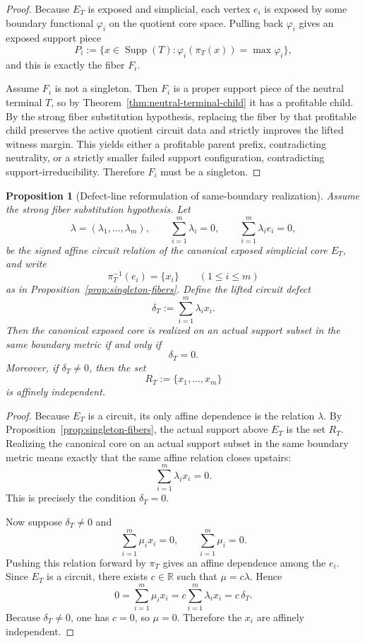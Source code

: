 \documentclass[11pt]{article}
\newtheorem{proposition}[theorem]{Proposition}
\theoremstyle{definition}
\newcommand{\R}{\mathbb{R}}
\newcommand{\1}{\mathbf{1}}
\begin{document}
\begin{proof}
Because $E_T$ is exposed and simplicial, each vertex $e_i$ is exposed by some boundary functional $\varphi_i$ on the quotient core space. Pulling back $\varphi_i$ gives an exposed support piece
\[
P_i:=\{x\in \operatorname{Supp}(T):\varphi_i(\pi_T(x))=\max \varphi_i\},
\]
and this is exactly the fiber $F_i$.

Assume $F_i$ is not a singleton. Then $F_i$ is a proper support piece of the neutral terminal $T$, so by Theorem~\ref{thm:neutral-terminal-child} it has a profitable child. By the strong fiber substitution hypothesis, replacing the fiber by that profitable child preserves the active quotient circuit data and strictly improves the lifted witness margin. This yields either a profitable parent prefix, contradicting neutrality, or a strictly smaller failed support configuration, contradicting support-irreducibility. Therefore $F_i$ must be a singleton.
\end{proof}

\begin{proposition}[Defect-line reformulation of same-boundary realization]\label{prop:defect-line}
Assume the strong fiber substitution hypothesis. Let
\[
\lambda=(\lambda_1,\dots,\lambda_m),
\qquad
\sum_{i=1}^m \lambda_i=0,
\qquad
\sum_{i=1}^m \lambda_i e_i=0,
\]
be the signed affine circuit relation of the canonical exposed simplicial core $E_T$, and write
\[
\pi_T^{-1}(e_i)=\{x_i\}
\qquad (1\le i\le m)
\]
as in Proposition~\ref{prop:singleton-fibers}. Define the \emph{lifted circuit defect}
\[
\delta_T:=\sum_{i=1}^m \lambda_i x_i.
\]
Then the canonical exposed core is realized on an actual support subset in the same boundary metric if and only if
\[
\delta_T=0.
\]
Moreover, if $\delta_T\neq 0$, then the set
\[
R_T:=\{x_1,\dots,x_m\}
\]
is affinely independent.
\end{proposition}

\begin{proof}
Because $E_T$ is a circuit, its only affine dependence is the relation $\lambda$. By Proposition~\ref{prop:singleton-fibers}, the actual support above $E_T$ is the set $R_T$. Realizing the canonical core on an actual support subset in the same boundary metric means exactly that the same affine relation closes upstairs:
\[
\sum_{i=1}^m \lambda_i x_i=0.
\]
This is precisely the condition $\delta_T=0$.

Now suppose $\delta_T\neq 0$ and
\[
\sum_{i=1}^m \mu_i x_i=0,
\qquad
\sum_{i=1}^m \mu_i=0.
\]
Pushing this relation forward by $\pi_T$ gives an affine dependence among the $e_i$. Since $E_T$ is a circuit, there exists $c\in \R$ such that $\mu=c\lambda$. Hence
\[
0=\sum_{i=1}^m \mu_i x_i
=
c\sum_{i=1}^m \lambda_i x_i
=
c\,\delta_T.
\]
Because $\delta_T\neq 0$, one has $c=0$, so $\mu=0$. Therefore the $x_i$ are affinely independent.
\end{proof}
\end{document}
